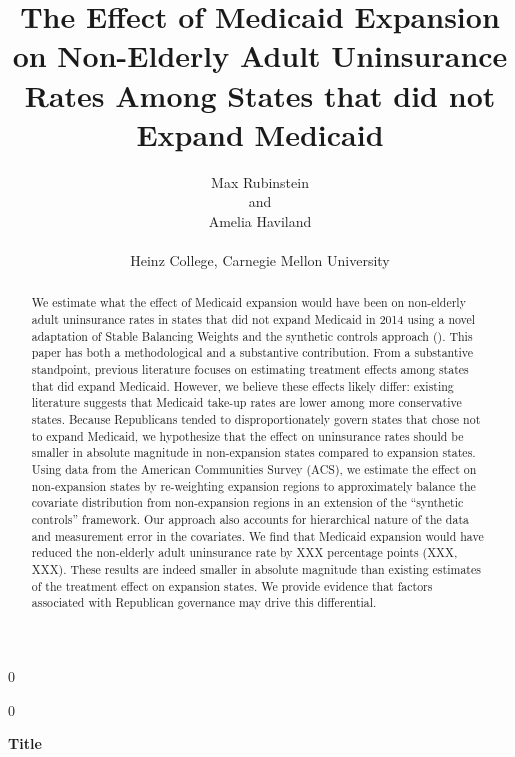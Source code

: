 \documentclass[12pt]{article}
\newcommand{\blind}{0}
\begin{document}
\blind
{
  \title{\bf The Effect of Medicaid Expansion on Non-Elderly Adult Uninsurance Rates Among States that did not Expand Medicaid}
  \author{Max Rubinstein \hspace{.2cm}\\
    and \\
    Amelia Haviland \\ \\
    Heinz College, Carnegie Mellon University}
  \maketitle
} \fi

\blind
{
  \bigskip
  \bigskip
  \bigskip
  \begin{center}
    {\LARGE\bf Title}
\end{center}
  \medskip
} \fi

\bigskip

\begin{abstract}

We estimate what the effect of Medicaid expansion would have been on non-elderly adult uninsurance rates in states that did not expand Medicaid in 2014 using a novel adaptation of Stable Balancing Weights \cite{zubizarreta2015stable} and the synthetic controls approach (\cite{abadie2010synthetic}). This paper has both a methodological and a substantive contribution. From a substantive standpoint, previous literature focuses on estimating treatment effects among states that did expand Medicaid. However, we believe these effects likely differ: existing literature suggests that Medicaid take-up rates are lower among more conservative states. Because Republicans tended to disproportionately govern states that chose not to expand Medicaid, we hypothesize that the effect on uninsurance rates should be smaller in absolute magnitude in non-expansion states compared to expansion states. Using data from the American Communities Survey (ACS), we estimate the effect on non-expansion states by re-weighting expansion regions to approximately balance the covariate distribution from non-expansion regions in an extension of the ``synthetic controls'' framework. Our approach also accounts for hierarchical nature of the data and measurement error in the covariates. We find that Medicaid expansion would have reduced the non-elderly adult uninsurance rate by XXX percentage points (XXX, XXX). These results are indeed smaller in absolute magnitude than existing estimates of the treatment effect on expansion states. We provide evidence that factors associated with Republican governance may drive this differential.

\end{abstract}
\end{document}
